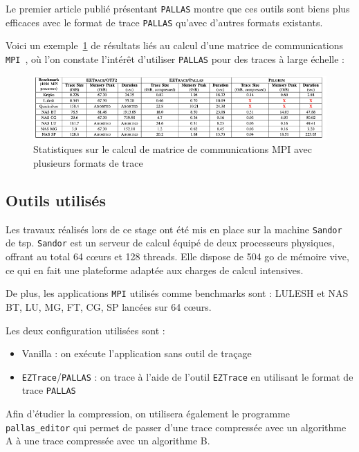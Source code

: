 Le premier article \cite{pallas_ipdps} publié présentant \verb!PALLAS! montre que ces outils sont biens plus efficaces avec le format de trace \verb!PALLAS! qu'avec d'autres formats existants.

Voici un exemple~\ref{fig:comm} de résultats liés au calcul d'une matrice de communications \verb!MPI!~\cite{pallas_ipdps}, où l'on constate l'intérêt d'utiliser \verb!PALLAS! pour des traces à large échelle :

\begin{figure}[!h]
    \centering
    \includegraphics[width=1\textwidth]{img/comm.png}
    \caption{Statistiques sur le calcul de matrice de communications MPI avec plusieurs formats de trace}
    \label{fig:comm}
\end{figure}

\subsection{Outils utilisés}\label{ssec:outils}

Les travaux réalisés lors de ce stage ont été mis en place sur la machine \verb!Sandor! de \gls{tsp}.
\verb!Sandor! est un serveur de calcul équipé de deux processeurs physiques, 
offrant au total 64 c\oe{}urs et 128 threads.
Elle dispose de 504 \gls{go} de mémoire vive, ce qui en fait une plateforme adaptée aux charges de calcul intensives.\par
De plus, les applications \verb!MPI! utilisés comme benchmarks sont : LULESH et NAS BT, LU, MG, FT, CG, SP lancées sur 64 c\oe{}urs.

Les deux configuration utilisées sont : 
\begin{itemize}
    \item Vanilla : on exécute l'application sans outil de traçage
    \item \verb!EZTrace!/\verb!PALLAS! : on trace à l'aide de l'outil \verb!EZTrace! en utilisant le format de trace \verb!PALLAS!
\end{itemize}

Afin d'étudier la compression, on utilisera également le programme \verb!pallas_editor! qui permet de passer d'une trace compressée avec un algorithme A à une trace compressée avec
un algorithme B.
